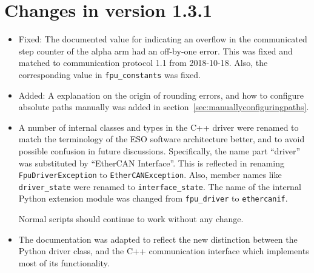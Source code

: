 \documentclass[fontsize=12,a4paper]{scrreprt}
\begin{document}
\section*{Changes in version 1.3.1}
\begin{itemize}
\item Fixed: The documented value for indicating an overflow in the
  communicated step counter of the alpha arm had an off-by-one error.
  This was fixed and matched to communication protocol 1.1 from
  2018-10-18. Also, the corresponding value in \texttt{fpu\_constants}
  was fixed.
\item Added: A explanation on the origin of rounding errors, and how
  to configure absolute paths manually was added in
  section~\ref{sec:manuallyconfiguringpaths}.

\item A number of internal classes and types in the C++ driver were
  renamed to match the terminology of the ESO software architecture
  better, and to avoid possible confusion in future
  discussions. Specifically, the name part ``driver'' was substituted
  by ``EtherCAN Interface''.  This is reflected in renaming
  \texttt{FpuDriverException} to \texttt{EtherCANException}. Also,
  member names like \texttt{driver\_state} were renamed to
  \texttt{interface\_state}. The name of the internal Python extension
  module was changed from \texttt{fpu\_driver} to \texttt{ethercanif}.

  Normal scripts should continue to work without any change.


\item The documentation was adapted to reflect the new distinction
  between the Python driver class, and the C++ communication interface
  which implements most of its functionality.
\end{itemize}
\end{document}
